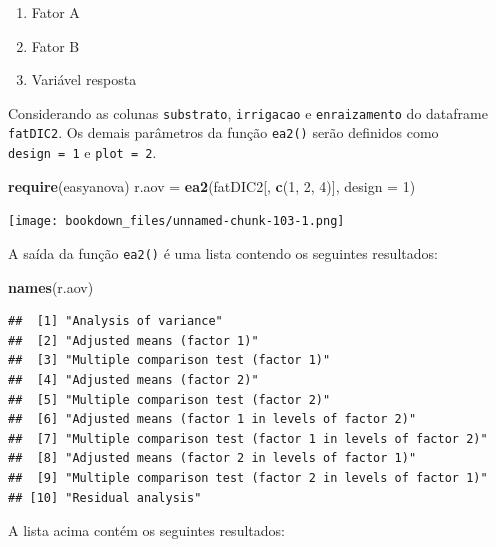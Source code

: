 \documentclass[
]{article}
\newenvironment{Shaded}{\begin{snugshade}}{\end{snugshade}}
\newcommand{\DataTypeTok}[1]{\textcolor[rgb]{0.13,0.29,0.53}{#1}}
\newcommand{\DecValTok}[1]{\textcolor[rgb]{0.00,0.00,0.81}{#1}}
\newcommand{\KeywordTok}[1]{\textcolor[rgb]{0.13,0.29,0.53}{\textbf{#1}}}
\newcommand{\NormalTok}[1]{#1}
\newcommand{\StringTok}[1]{\textcolor[rgb]{0.31,0.60,0.02}{#1}}
\providecommand{\tightlist}{%
  \setlength{\itemsep}{0pt}\setlength{\parskip}{0pt}}
\begin{document}
\begin{enumerate}
\def\labelenumi{\arabic{enumi}.}
\tightlist
\item
  Fator A
\item
  Fator B
\item
  Variável resposta
\end{enumerate}

Considerando as colunas \texttt{substrato}, \texttt{irrigacao} e \texttt{enraizamento} do dataframe \texttt{fatDIC2}. Os demais parâmetros da função \texttt{ea2()} serão definidos como \texttt{design\ =\ 1} e \texttt{plot\ =\ 2}.

\begin{Shaded}
\begin{Highlighting}[]
\KeywordTok{require}\NormalTok{(easyanova)}
\NormalTok{r.aov =}\StringTok{ }\KeywordTok{ea2}\NormalTok{(fatDIC2[, }\KeywordTok{c}\NormalTok{(}\DecValTok{1}\NormalTok{, }\DecValTok{2}\NormalTok{, }\DecValTok{4}\NormalTok{)], }\DataTypeTok{design =} \DecValTok{1}\NormalTok{)}
\end{Highlighting}
\end{Shaded}

\texttt{[image: bookdown\_files/unnamed-chunk-103-1.png]}

A saída da função \texttt{ea2()} é uma lista contendo os seguintes resultados:

\begin{Shaded}
\begin{Highlighting}[]
\KeywordTok{names}\NormalTok{(r.aov)}
\end{Highlighting}
\end{Shaded}

\begin{verbatim}
##  [1] "Analysis of variance"                                     
##  [2] "Adjusted means (factor 1)"                                
##  [3] "Multiple comparison test (factor 1)"                      
##  [4] "Adjusted means (factor 2)"                                
##  [5] "Multiple comparison test (factor 2)"                      
##  [6] "Adjusted means (factor 1 in levels of factor 2)"          
##  [7] "Multiple comparison test (factor 1 in levels of factor 2)"
##  [8] "Adjusted means (factor 2 in levels of factor 1)"          
##  [9] "Multiple comparison test (factor 2 in levels of factor 1)"
## [10] "Residual analysis"
\end{verbatim}

A lista acima contém os seguintes resultados:
\end{document}
